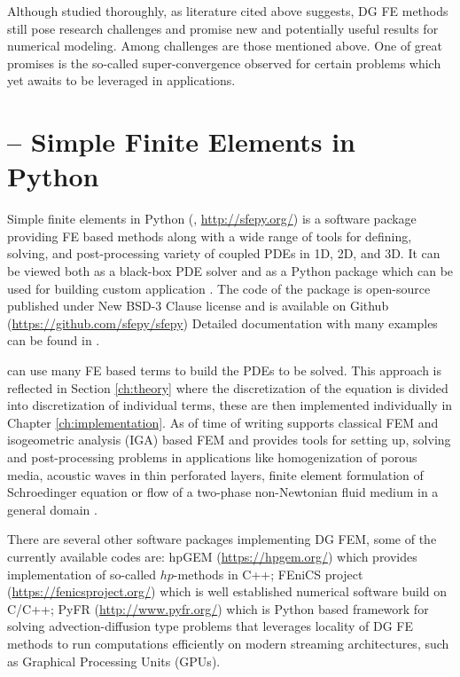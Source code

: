 Although studied thoroughly, as literature cited above suggests, DG FE methods
still pose research challenges and promise new and potentially useful results
for numerical modeling. Among challenges are those mentioned above. One of
great promises is the so-called super-convergence observed for certain problems
\cite{Roe2017} which yet awaits to be leveraged in applications.


\section{\sfepy{} -- Simple Finite Elements in Python}

Simple finite elements in Python (\sfepy{},
\url{http://sfepy.org/}) is a software package providing FE based methods
along with a wide range of tools for defining, solving, and post-processing
variety of coupled PDEs in 1D, 2D, and 3D. It can be viewed both as a
black-box PDE solver and as a Python package which can be used for building
custom application \cite{Cimrman_Lukes_Rohan_2019}. The code of the package is
open-source published under New BSD-3 Clause license \cite{bsd3-lic} and is
available on Github (\url{https://github.com/sfepy/sfepy}) %
Detailed documentation with many examples can be found in \cite{sfepy-doc}.

\sfepy{} can use many FE based terms to build the PDEs to be solved. This
approach is reflected in Section \ref{ch:theory} where the discretization of
the equation is divided into discretization of individual terms, these are
then implemented individually in Chapter \ref{ch:implementation}. As of time
of writing \sfepy{} supports classical FEM and isogeometric analysis (IGA)
based FEM and provides tools for setting up, solving and post-processing
problems in applications like homogenization of porous media, acoustic waves
in thin perforated layers, finite element formulation of Schroedinger equation
or flow of a two-phase non-Newtonian fluid medium in a general domain
\cite{Cimrman_Lukes_Rohan_2019}.

There are several other software packages implementing  DG FEM, some of the
currently available codes are: hpGEM \cite{hpgem2007}
(\url{https://hpgem.org/}) which provides implementation of so-called
$hp$-methods in C++; FEniCS project \cite{fenics2015}
(\url{https://fenicsproject.org/}) which is well established numerical
software build on C/C++; PyFR \cite{pyfr2014} (\url{http://www.pyfr.org/})
which is  Python based framework for solving advection-diffusion type problems
that leverages locality of DG FE methods to run computations efficiently on
modern streaming architectures, such as Graphical Processing Units
(GPUs)\cite{pyfr2014}.
